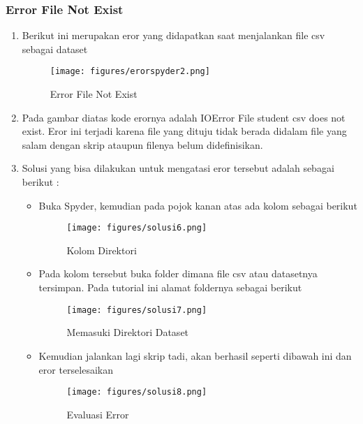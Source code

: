 \subsubsection{Error File Not Exist}
\begin{enumerate}
	\item
Berikut ini merupakan eror yang didapatkan saat menjalankan file csv sebagai dataset
\begin{figure}[ht]
\centering
\texttt{[image: figures/erorspyder2.png]}
\caption{Error File Not Exist}
\label{Error}
\end{figure}
	\item
Pada gambar diatas kode erornya adalah IOError File student csv does not exist. Eror ini terjadi karena file yang dituju tidak berada didalam file yang salam dengan skrip ataupun filenya belum didefinisikan.
	\item
Solusi yang bisa dilakukan untuk mengatasi eror tersebut adalah sebagai berikut : \\
\begin{itemize}
\item
Buka Spyder, kemudian pada pojok kanan atas ada kolom sebagai berikut
\begin{figure}[ht]
\centering
\texttt{[image: figures/solusi6.png]}
\caption{Kolom Direktori}
\label{Eror}
\end{figure}
\item
Pada kolom tersebut buka folder dimana file csv atau datasetnya tersimpan. Pada tutorial ini alamat foldernya sebagai berikut
\begin{figure}[ht]
\centering
\texttt{[image: figures/solusi7.png]}
\caption{Memasuki Direktori Dataset}
\label{Eror}
\end{figure}
\item
Kemudian jalankan lagi skrip tadi, akan berhasil seperti dibawah ini dan eror terselesaikan
\begin{figure}[ht]
\centering
\texttt{[image: figures/solusi8.png]}
\caption{Evaluasi Error}
\label{Eror}
\end{figure}
\end{itemize}
\end{enumerate}
